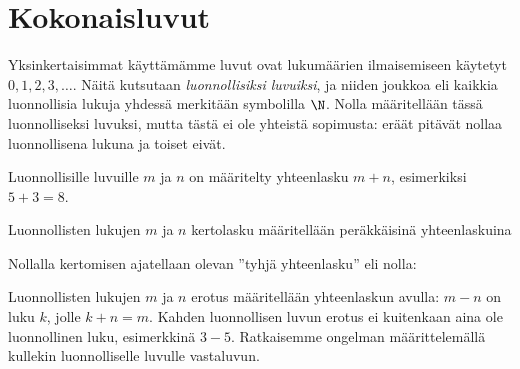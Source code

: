 
% 
% 
% 


% 
% 
% 

\section*{Kokonaisluvut}

Yksinkertaisimmat käyttämämme luvut ovat lukumäärien ilmaisemiseen käytetyt $0, 1, 2, 3, \ldots$. Näitä kutsutaan \emph{luonnollisiksi luvuiksi}, ja niiden joukkoa eli kaikkia luonnollisia lukuja yhdessä merkitään symbolilla $\N$.
Nolla määritellään tässä luonnolliseksi luvuksi, mutta tästä ei ole yhteistä sopimusta: eräät pitävät nollaa luonnollisena lukuna ja toiset eivät.

Luonnollisille luvuille $m$ ja $n$ on määritelty yhteenlasku $m + n$, esimerkiksi $5 + 3 = 8$.

Luonnollisten lukujen $m$ ja $n$ kertolasku määritellään peräkkäisinä yhteenlaskuina
\laatikko{
\[m \cdot n = \underbrace{m + m + \ldots + m}_{n\text{ kpl}} = \underbrace{n + n + \ldots + n}_{m\text{ kpl}}.\]
}

Nollalla kertomisen ajatellaan olevan ''tyhjä yhteenlasku'' eli nolla:

\laatikko{
\[0 \cdot m = 0\]
}

Luonnollisten lukujen $m$ ja $n$ erotus määritellään yhteenlaskun avulla:
$m-n$ on luku $k$, jolle $k + n = m$. Kahden luonnollisen luvun erotus
ei kuitenkaan aina ole luonnollinen luku, esimerkkinä $3 - 5$.
Ratkaisemme ongelman määrittelemällä kullekin luonnolliselle
luvulle vastaluvun.


